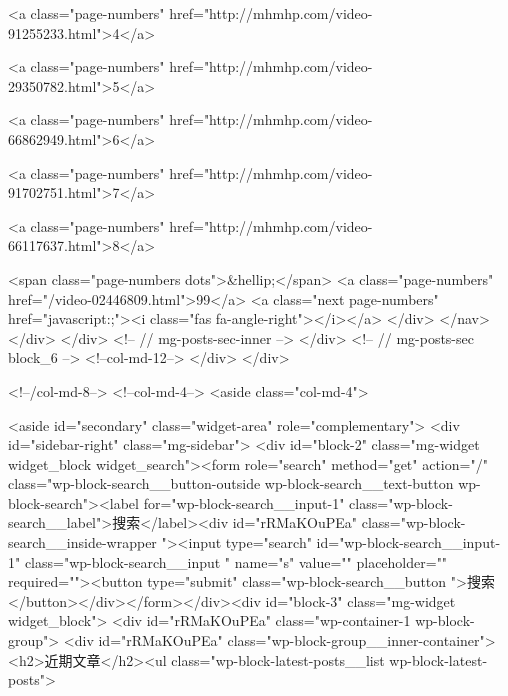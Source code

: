                                                 <a class="page-numbers" href="http://mhmhp.com/video-91255233.html">4</a>
                                                
                                                <a class="page-numbers" href="http://mhmhp.com/video-29350782.html">5</a>
                                                
                                                <a class="page-numbers" href="http://mhmhp.com/video-66862949.html">6</a>
                                                
                                                <a class="page-numbers" href="http://mhmhp.com/video-91702751.html">7</a>
                                                
                                                <a class="page-numbers" href="http://mhmhp.com/video-66117637.html">8</a>
                                                
                                                <span class="page-numbers dots">&hellip;</span>
                                                <a class="page-numbers" href="/video-02446809.html">99</a>
                                                <a class="next page-numbers" href="javascript:;"><i class="fas fa-angle-right"></i></a>
                                            </div>
                                        </nav>
                                    </div>
                                </div>
                                <!-- // mg-posts-sec-inner -->
                            </div>
                            <!-- // mg-posts-sec block_6 -->
                            <!--col-md-12-->
                        </div>
                    </div>

                    <!--/col-md-8-->
                    <!--col-md-4-->
                    <aside class="col-md-4">

    <aside id="secondary" class="widget-area" role="complementary">
        <div id="sidebar-right" class="mg-sidebar">
            <div id="block-2" class="mg-widget widget_block widget_search"><form role="search" method="get" action="/" class="wp-block-search__button-outside wp-block-search__text-button wp-block-search"><label for="wp-block-search__input-1" class="wp-block-search__label">搜索</label><div id="rRMaKOuPEa"  class="wp-block-search__inside-wrapper "><input type="search" id="wp-block-search__input-1" class="wp-block-search__input " name="s" value="" placeholder="" required=""><button type="submit" class="wp-block-search__button  ">搜索</button></div></form></div><div id="block-3" class="mg-widget widget_block">
                <div id="rRMaKOuPEa"  class="wp-container-1 wp-block-group">
                    <div id="rRMaKOuPEa"  class="wp-block-group__inner-container">
                        <h2>近期文章</h2><ul class="wp-block-latest-posts__list wp-block-latest-posts">
                            
